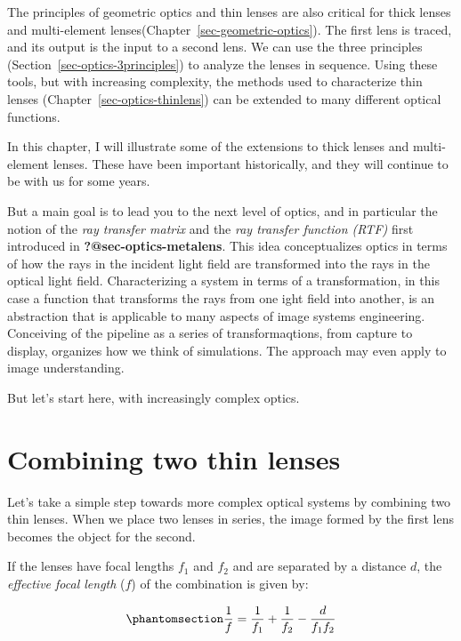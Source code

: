 \documentclass[
  letterpaper,
]{book}
\begin{document}
The principles of geometric optics and thin lenses are also critical for
thick lenses and multi-element
lenses(Chapter~\ref{sec-geometric-optics}). The first lens is traced,
and its output is the input to a second lens. We can use the three
principles (Section~\ref{sec-optics-3principles}) to analyze the lenses
in sequence. Using these tools, but with increasing complexity, the
methods used to characterize thin lenses
(Chapter~\ref{sec-optics-thinlens}) can be extended to many different
optical functions.

In this chapter, I will illustrate some of the extensions to thick
lenses and multi-element lenses. These have been important historically,
and they will continue to be with us for some years.

But a main goal is to lead you to the next level of optics, and in
particular the notion of the \emph{ray transfer matrix} and the
\emph{ray transfer function (RTF)} first introduced in
\textbf{?@sec-optics-metalens}. This idea conceptualizes optics in terms
of how the rays in the incident light field are transformed into the
rays in the optical light field. Characterizing a system in terms of a
transformation, in this case a function that transforms the rays from
one ight field into another, is an abstraction that is applicable to
many aspects of image systems engineering. Conceiving of the pipeline as
a series of transformaqtions, from capture to display, organizes how we
think of simulations. The approach may even apply to image
understanding.

But let's start here, with increasingly complex optics.

\section{Combining two thin lenses}\label{combining-two-thin-lenses}

Let's take a simple step towards more complex optical systems by
combining two thin lenses. When we place two lenses in series, the image
formed by the first lens becomes the object for the second.

If the lenses have focal lengths \(f_1\) and \(f_2\) and are separated
by a distance \(d\), the \emph{effective focal length} (\(f\)) of the
combination is given by:

\begin{equation}\phantomsection\label{eq-two-thin-lens}{
\frac{1}{f} = \frac{1}{f_1} + \frac{1}{f_2} - \frac{d}{f_1 f_2}
}\end{equation}
\end{document}
